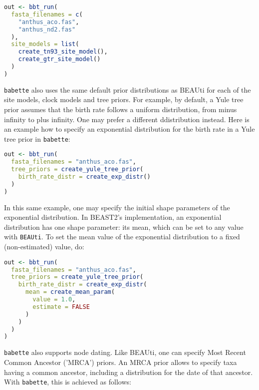\documentclass{article}
\begin{document}
\begin{lstlisting}[language=R, floatplacement=H]
out <- bbt_run(
  fasta_filenames = c(
    "anthus_aco.fas", 
    "anthus_nd2.fas"
  ),
  site_models = list(
    create_tn93_site_model(), 
    create_gtr_site_model()
  )
)
\end{lstlisting}
\verb;babette; also uses the same default prior distributions as BEAUti 
for each of the site models, clock models and tree priors. 
For example, by default, a Yule tree prior assumes that the birth rate 
follows a uniform distribution, 
from minus infinity to plus infinity. 
One may prefer a different ddistribution instead. 
Here is an example how to specify an exponential distribution for
the birth rate in a Yule tree prior in \verb;babette;:

\begin{lstlisting}[language=R, floatplacement=H]
out <- bbt_run(
  fasta_filenames = "anthus_aco.fas",
  tree_priors = create_yule_tree_prior(
    birth_rate_distr = create_exp_distr()    
  )
)
\end{lstlisting}
In this same example, one may specify
the initial shape parameters of the exponential distribution.
In BEAST2's implementation, an exponential distribution 
has one shape parameter: its mean, which can be set to any
value with \verb;BEAUti;. To set the 
mean value of the exponential distribution to a 
fixed (non-estimated) value, do: 

\begin{lstlisting}[language=R, floatplacement=H]
out <- bbt_run(
  fasta_filenames = "anthus_aco.fas",
  tree_priors = create_yule_tree_prior(
    birth_rate_distr = create_exp_distr(
      mean = create_mean_param(
        value = 1.0, 
        estimate = FALSE
      )
    )    
  )
)
\end{lstlisting}
\verb;babette; also supports node dating. Like BEAUti, one
can specify Most Recent Common Ancestor ('MRCA') priors.
An MRCA prior allows to specify taxa having a common ancestor,
including a distribution for the date of that ancestor.
With \verb;babette;, this is achieved as follows:
\end{document}
